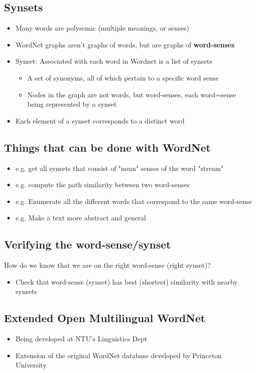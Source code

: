 \documentclass[a4paper]{article}
\begin{document}
\subsection{Synsets}
\begin{itemize}
    \item Many words are polysemic (multiple meanings, or senses)
    \item WordNet graphs aren't graphs of words, but are graphs of \textbf{word-senses}
    \item Synset: Associated with each word in Wordnet is a list of synsets
    \begin{itemize}[label=$\circ$]
        \item A set of synonyms, all of which pertain to a specific word sense
        \item Nodes in the graph are not words, but word-senses, each word=sense being represented by a synset
    \end{itemize}
    \item Each element of a synset corresponds to a distinct word
\end{itemize}

\subsection{Things that can be done with WordNet}
\begin{itemize}
    \item e.g. get all synsets that consist of "noun" senses of the word "stream"
    \item e.g. compute the path similarity between two word-senses
    \item e.g. Enumerate all the different words that correspond to the same word-sense
    \item e.g. Make a text more abstract and general
\end{itemize}

\subsection{Verifying the word-sense/synset}
How do we know that we are on the right word-sense (right synset)?
\begin{itemize}
    \item Check that word-sense (synset) has best (shortest) similarity with nearby synsets
\end{itemize}

\subsection{Extended Open Multilingual WordNet}
\begin{itemize}
    \item Being developed at NTU's Linguistics Dept
    \item Extension of the original WordNet database developed by Princeton University
\end{itemize}
\end{document}
